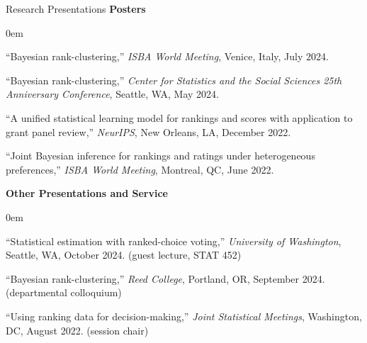 \documentclass{resume} %
\begin{document}
\begin{rSection}{Research Presentations}
\noindent\textbf{Posters}
\begin{etaremune}
\itemsep0em
\item ``Bayesian rank-clustering,'' \textit{ISBA World Meeting}, Venice, Italy, July 2024.
\item ``Bayesian rank-clustering,'' \textit{Center for Statistics and the Social Sciences 25th Anniversary Conference}, Seattle, WA, May 2024.
\item ``A unified statistical learning model for rankings and scores with application to grant panel review,'' \textit{NeurIPS}, New Orleans, LA, December 2022.
\item ``Joint Bayesian inference for rankings and ratings under heterogeneous preferences,'' \textit{ISBA World Meeting}, Montreal, QC, June 2022.
\end{etaremune}

\noindent\textbf{Other Presentations and Service}
\begin{etaremune}
\itemsep0em
\item ``Statistical estimation with ranked-choice voting,'' \textit{University of Washington}, Seattle, WA, October 2024. (guest lecture, STAT 452)
\item ``Bayesian rank-clustering,'' \textit{Reed College}, Portland, OR, September 2024. (departmental colloquium)
\item ``Using ranking data for decision-making,'' \textit{Joint Statistical Meetings}, Washington, DC, August 2022. (session chair)
\end{etaremune}

\end{rSection}
\end{document}
